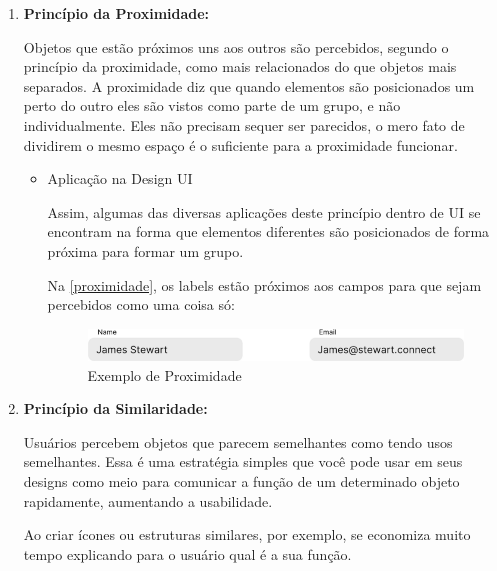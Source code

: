 \begin{enumerate}
    \item \textbf{Princípio da Proximidade:}
    
    Objetos que estão próximos uns aos outros são percebidos, segundo o princípio da proximidade, como mais relacionados do que objetos mais separados. A proximidade diz que quando elementos são posicionados um perto do outro eles são vistos como parte de um grupo, e não individualmente. Eles não precisam sequer ser parecidos, o mero fato de dividirem o mesmo espaço é o suficiente para a proximidade funcionar.
    
    \begin{itemize}
        \item Aplicação na Design \ac{UI}
        
        Assim, algumas das diversas aplicações deste princípio dentro de \ac{UI} se encontram na forma que elementos diferentes são posicionados de forma próxima para formar um grupo.
        
        Na \autoref{proximidade}, os labels estão próximos aos campos para que sejam percebidos como uma coisa só:
        
        \begin{figure}[htb]
        	\begin{center}
        	    \includegraphics[scale=0.45]{figs/proximidade.png}
        	\end{center}
        	\caption{\label{proximidade}Exemplo de Proximidade}
        \end{figure}
    \end{itemize}

    \item \textbf{Princípio da Similaridade:}
    
    Usuários percebem objetos que parecem semelhantes como tendo usos semelhantes. Essa é uma estratégia simples que você pode usar em seus designs como meio para comunicar a função de um determinado objeto rapidamente, aumentando a usabilidade.
    
    Ao criar ícones ou estruturas similares, por exemplo, se economiza muito tempo explicando para o usuário qual é a sua função.
    

\end{enumerate}
